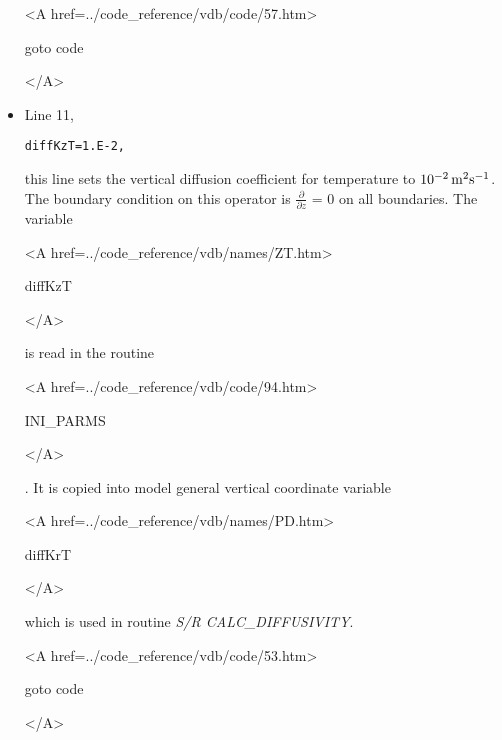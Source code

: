 \begin{itemize}
{\bf
\begin{rawhtml} <A href=../code_reference/vdb/code/57.htm> \end{rawhtml}
goto code
\begin{rawhtml} </A>\end{rawhtml}
}

\item Line 11,
\begin{verbatim}
diffKzT=1.E-2,
\end{verbatim}
this line sets the vertical diffusion coefficient for temperature
to $10^{-2}\,{\rm m^{2}s^{-1}}$. The boundary condition on this
operator is $\frac{\partial}{\partial z}$ = 0 on all boundaries.
The variable
{\bf
\begin{rawhtml} <A href=../code_reference/vdb/names/ZT.htm> \end{rawhtml}
diffKzT
\begin{rawhtml} </A>\end{rawhtml}
}
is read in the routine
{\it
\begin{rawhtml} <A href=../code_reference/vdb/code/94.htm> \end{rawhtml}
INI\_PARMS
\begin{rawhtml} </A>\end{rawhtml}
}.
It is copied into model general vertical coordinate variable
{\bf
\begin{rawhtml} <A href=../code_reference/vdb/names/PD.htm> \end{rawhtml}
diffKrT
\begin{rawhtml} </A>\end{rawhtml}
} which is used in routine {\it S/R CALC\_DIFFUSIVITY}.

{\bf
\begin{rawhtml} <A href=../code_reference/vdb/code/53.htm> \end{rawhtml}
goto code
\begin{rawhtml} </A>\end{rawhtml}
}




\end{itemize}
